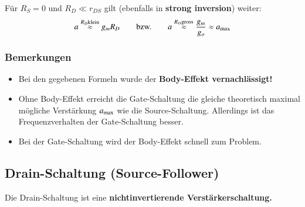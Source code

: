 Für $R_S = 0$ und $R_D \ll r_{DS}$ gilt (ebenfalls in \textbf{strong inversion}) weiter: 
\[
    a \overset{R_D \text{klein}}{\approx} g_m R_D \qquad \text{bzw.} \qquad a \overset{R_D \text{gross}}{\approx} \frac{g_m}{g_o} \approx a_{\rm max}
\]


\subsubsection{Bemerkungen}
\begin{itemize}
    \item Bei den gegebenen Formeln wurde der \textbf{Body-Effekt vernachlässigt!}
    \item Ohne Body-Effekt erreicht die Gate-Schaltung die gleiche theoretisch maximal mögliche Verstärkung $a_{\rm max}$ wie die Source-Schaltung.
        Allerdings ist das Frequenzverhalten der Gate-Schaltung besser.
    \item Bei der Gate-Schaltung wird der Body-Effekt schnell zum Problem.
\end{itemize}



\subsection{Drain-Schaltung (Source-Follower)}

Die Drain-Schaltung ist eine \textbf{nichtinvertierende Verstärkerschaltung.}

\smallskip

